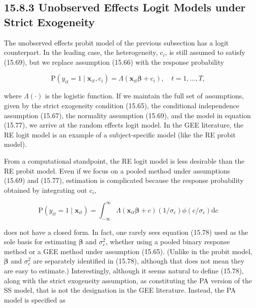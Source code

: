 \documentclass[10pt]{article}
\begin{document}
\subsection*{15.8.3 Unobserved Effects Logit Models under Strict Exogeneity}
The unobserved effects probit model of the previous subsection has a logit counterpart. In the leading case, the heterogeneity, $c_{i}$, is still assumed to satisfy (15.69), but we replace assumption (15.66) with the response probability


\begin{equation*}
\mathrm{P}\left(y_{i t}=1 \mid \mathbf{x}_{i t}, c_{i}\right)=\Lambda\left(\mathbf{x}_{i t} \boldsymbol{\beta}+c_{i}\right), \quad t=1, \ldots, T, \tag{15.77}
\end{equation*}


where $\Lambda(\cdot)$ is the logistic function. If we maintain the full set of assumptions, given by the strict exogeneity condition (15.65), the conditional independence assumption (15.67), the normality assumption (15.69), and the model in equation (15.77), we arrive at the random effects logit model. In the GEE literature, the RE logit model is an example of a subject-specific model (like the RE probit model).

From a computational standpoint, the RE logit model is less desirable than the RE probit model. Even if we focus on a pooled method under assumptions (15.69) and (15.77), estimation is complicated because the response probability obtained by integrating out $c_{i}$,


\begin{equation*}
\mathrm{P}\left(y_{i t}=1 \mid \mathbf{x}_{i t}\right)=\int_{-\infty}^{\infty} \Lambda\left(\mathbf{x}_{i t} \boldsymbol{\beta}+c\right)\left(1 / \sigma_{c}\right) \phi\left(c / \sigma_{c}\right) \mathrm{d} c \tag{15.78}
\end{equation*}


does not have a closed form. In fact, one rarely sees equation (15.78) used as the sole basis for estimating $\boldsymbol{\beta}$ and $\sigma_{c}^{2}$, whether using a pooled binary response method or a GEE method under assumption (15.65). (Unlike in the probit model, $\boldsymbol{\beta}$ and $\sigma_{c}^{2}$ are separately identified in (15.78), although that does not mean they are easy to estimate.) Interestingly, although it seems natural to define (15.78), along with the strict exogeneity assumption, as constituting the PA version of the SS model, that is not the designation in the GEE literature. Instead, the PA model is specified as
\end{document}
